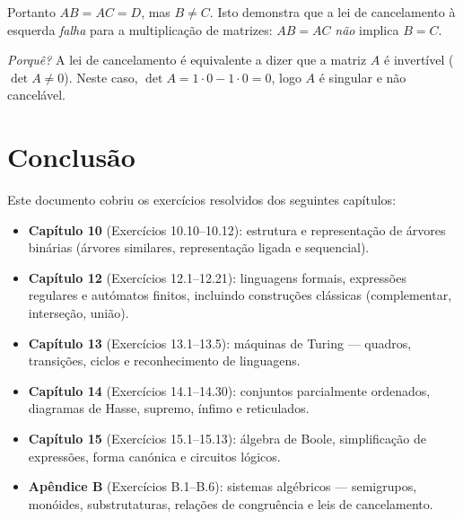 \documentclass[12pt,a4paper]{article}
\begin{document}
Portanto $AB = AC = D$, mas $B \ne C$. Isto demonstra que a lei de cancelamento
à esquerda \emph{falha} para a multiplicação de matrizes: $AB = AC$ \emph{não}
implica $B = C$.

\medskip
\noindent\textit{Porquê?} A lei de cancelamento é equivalente a dizer que a
matriz $A$ é invertível ($\det A \ne 0$). Neste caso,
$\det A = 1 \cdot 0 - 1 \cdot 0 = 0$, logo $A$ é singular e não cancelável.

\newpage
\section*{Conclusão}

Este documento cobriu os exercícios resolvidos dos seguintes capítulos:

\begin{itemize}
  \item \textbf{Capítulo 10} (Exercícios 10.10--10.12): estrutura e representação de
        árvores binárias (árvores similares, representação ligada e sequencial).
  \item \textbf{Capítulo 12} (Exercícios 12.1--12.21): linguagens formais, expressões
        regulares e autómatos finitos, incluindo construções clássicas (complementar,
        interseção, união).
  \item \textbf{Capítulo 13} (Exercícios 13.1--13.5): máquinas de Turing — quadros,
        transições, ciclos e reconhecimento de linguagens.
  \item \textbf{Capítulo 14} (Exercícios 14.1--14.30): conjuntos parcialmente ordenados,
        diagramas de Hasse, supremo, ínfimo e reticulados.
  \item \textbf{Capítulo 15} (Exercícios 15.1--15.13): álgebra de Boole, simplificação
        de expressões, forma canónica e circuitos lógicos.
  \item \textbf{Apêndice B} (Exercícios B.1--B.6): sistemas algébricos — semigrupos,
        monóides, substrutaturas, relações de congruência e leis de cancelamento.
\end{itemize}
\end{document}
